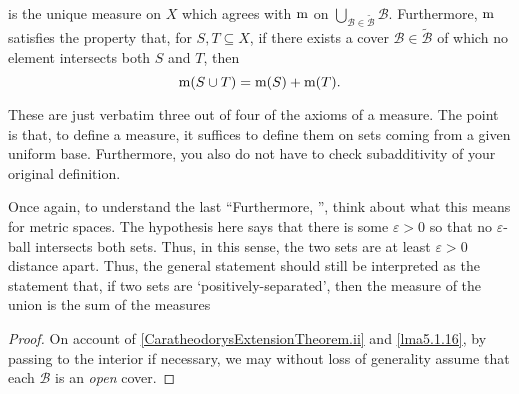 \begin{thm}
\begin{savenotes}
\begin{equation}
\begin{multlined}
\end{multlined}
\end{equation}
is the unique measure on $X$ which agrees with $\mathrm{m}$ on $\bigcup _{\mathcal{B}\in \widetilde{\mathcal{B}}}\mathcal{B}$.  Furthermore, $\mathrm{m}$ satisfies the property that, for $S,T\subseteq X$, if there exists a cover $\mathcal{B}\in \widetilde{\mathcal{B}}$ of which no element intersects both $S$ and $T$, then
\begin{equation}
\mathrm{m} (S\cup T)=\mathrm{m} (S)+\mathrm{m} (T).
\end{equation}
\begin{rmk}
These are just verbatim three out of four of the axioms of a measure.  The point is that, to define a measure, it suffices to define them on sets coming from a given uniform base.  Furthermore, you also do not have to check subadditivity of your original definition.
\end{rmk}
\begin{rmk}
Once again, to understand the last ``Furthermore, \textellipsis'', think about what this means for metric spaces.  The hypothesis here says that there is some $\varepsilon >0$ so that no $\varepsilon$-ball intersects both sets.  Thus, in this sense, the two sets are at least $\varepsilon >0$ distance apart.  Thus, the general statement should still be interpreted as the statement that, if two sets are `positively-separated', then the measure of the union is the sum of the measures
\end{rmk}
\begin{proof}
On account of \ref{CaratheodorysExtensionTheorem.ii} and \cref{lma5.1.16}, by passing to the interior if necessary, we may without loss of generality assume that each $\mathcal{B}$ is an \emph{open} cover.


\end{proof}
\end{savenotes}
\end{thm}
